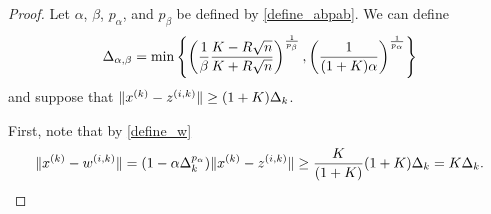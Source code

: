 \begin{proof}

Let $\alpha$, $\beta$, $p_{\alpha}$, and $p_{\beta}$ be defined by \cref{define_abpab}.
We can define
\begin{align}
{\Delta_{\alpha,\beta}} = \min\left\{
\left(\frac 1 {\beta }\frac {K - R\sqrt{n}}{K + R\sqrt{n}}\right)^{\frac 1 {p_{\beta }}},
\left(\frac 1 {(1+K)\alpha}\right)^{\frac 1 {p_{\alpha}}}
\right\} \label{define_deltalargzik}
\end{align}
and suppose that $\|x^{(k)} - {z^{(i, k)}}\| \ge (1+K) \Delta_k$.

First, note that by \cref{define_w}
\begin{align*}
\|x^{(k)} - {w^{(i, k)}}\| = (1 - \alpha\Delta_k^{p_{\alpha}}) \|x^{(k)} - {z^{(i, k)}}\| \ge \frac {K} {(1+K)} (1+K)\Delta_k = K\Delta_k.
\end{align*}


\end{proof}
